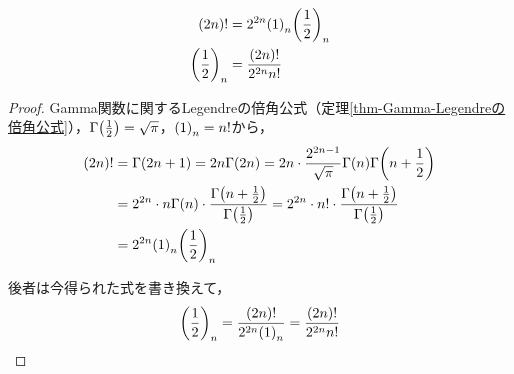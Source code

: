 \documentclass[a4paper,draft]{ltjsarticle}
\begin{document}
\begin{prop}\label{prop:poch-(2n)!}
    \begin{align}
        \pare{2n}!&=2^{2n}\poch{1}{n}\poch{\frac{1}{2}}{n} \label{eq:poch-(2n)!}
        \\
        \poch{\frac{1}{2}}{n}&=\dfrac{\pare{2n}!}{2^{2n}n!} \label{eq:poch-(1/2)_{n}}
    \end{align}
    \begin{proof}
        Gamma関数に関するLegendreの倍角公式（定理\ref{thm-Gamma-Legendreの倍角公式}），$\fun{\Gamma}{\frac{1}{2}}=\sqrt{\pi}$，$\poch{1}{n}=n!$から，
        \begin{align}
            \pare{2n}!&=\fun{\Gamma}{2n+1}=2n\fun{\Gamma}{2n}=2n\cdot \frac{2^{2n-1}}{\sqrt{\pi}}\fun{\Gamma}{n}\fun{\Gamma}{n+\frac{1}{2}}
            \\
            &=2^{2n}\cdot n\fun{\Gamma}{n}\cdot \frac{\fun{\Gamma}{n+\frac{1}{2}}}{\fun{\Gamma}{\frac{1}{2}}}=2^{2n}\cdot n!\cdot \frac{\fun{\Gamma}{n+\frac{1}{2}}}{\fun{\Gamma}{\frac{1}{2}}}
            \\
            &=2^{2n}\poch{1}{n}\poch{\frac{1}{2}}{n}
        \end{align}

        後者は今得られた式を書き換えて，
        \begin{equation}
            \poch{\frac{1}{2}}{n}=\frac{\pare{2n}!}{2^{2n}\poch{1}{n}}=\frac{\pare{2n}!}{2^{2n}n!}
        \end{equation}
    \end{proof}
\end{prop}
\end{document}
